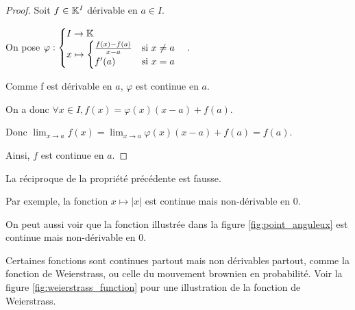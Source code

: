 \documentclass[12pt, a4paper]{report}
\begin{document}
\begin{proof}
    Soit $f \in \mathbb{K}^I$ dérivable en $a \in I$. 

    On pose $\varphi : \begin{cases}I\to\mathbb{K}\\x\mapsto \begin{cases}
\frac{f(x)-f(a)}{x-a} & \text{si } x \neq a\\
f'(a) & \text{si } x = a
    \end{cases}\end{cases}$.

    Comme f est dérivable en $a$, $\varphi$ est continue en $a$.

    On a donc $\forall x\in I, f(x)=\varphi(x)(x-a)+f(a)$.

    Donc $\lim_{x\to a} f(x) = \lim_{x\to a} \varphi(x)(x-a)+f(a) = f(a)$.

    Ainsi, $f$ est continue en $a$.
\end{proof}

\begin{remark}
    \begin{outline}
        \1 La réciproque de la propriété précédente est fausse.

        \2 Par exemple, la fonction $x\mapsto |x|$ est continue mais non-dérivable en $0$.
        
        \2 On peut aussi voir que la fonction illustrée dans la figure \ref{fig:point_anguleux} est continue mais non-dérivable en $0$.

        \1 Certaines fonctions sont continues partout mais non dérivables partout, comme la fonction de Weierstrass, ou celle du mouvement brownien en probabilité. Voir la figure \ref{fig:weierstrass_function} pour une illustration de la fonction de Weierstrass.
    \end{outline}
\end{remark}
\end{document}
